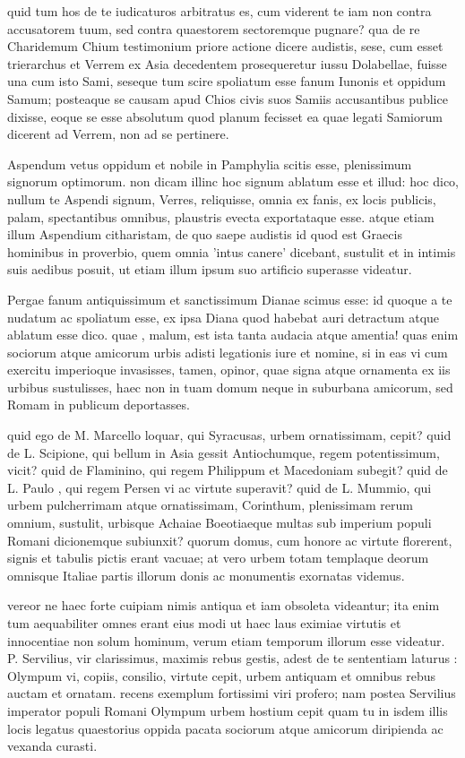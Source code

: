  quid tum hos de te iudicaturos arbitratus es, cum viderent te iam non contra accusatorem tuum, sed contra quaestorem sectoremque pugnare? qua de re Charidemum Chium testimonium priore actione dicere audistis, sese, cum esset trierarchus et Verrem ex Asia decedentem prosequeretur iussu Dolabellae, fuisse una cum isto Sami, seseque tum scire spoliatum esse fanum Iunonis et oppidum Samum; posteaque se causam apud Chios civis suos Samiis accusantibus publice dixisse, eoque se esse absolutum quod planum fecisset ea quae legati Samiorum dicerent ad Verrem, non ad se pertinere.

 Aspendum vetus oppidum et nobile in Pamphylia scitis esse, plenissimum signorum optimorum. non dicam illinc hoc signum ablatum esse et illud: hoc dico, nullum te Aspendi signum, Verres, reliquisse, omnia ex fanis, ex locis publicis, palam, spectantibus omnibus, plaustris evecta exportataque esse. atque etiam illum Aspendium citharistam, de quo saepe audistis id quod est Graecis hominibus in proverbio, quem omnia 'intus canere' dicebant, sustulit et in intimis suis aedibus posuit, ut etiam illum ipsum suo artificio superasse videatur.

 Pergae fanum antiquissimum et sanctissimum Dianae scimus esse: id quoque a te nudatum ac spoliatum esse, ex ipsa Diana quod habebat auri detractum atque ablatum esse dico. quae , malum, est ista tanta audacia atque amentia! quas enim sociorum atque amicorum urbis adisti legationis iure et nomine, si in eas vi cum exercitu imperioque invasisses, tamen, opinor, quae signa atque ornamenta ex iis urbibus sustulisses, haec non in tuam domum neque in suburbana amicorum, sed Romam in publicum deportasses.

 quid ego de M. Marcello loquar, qui Syracusas, urbem ornatissimam, cepit? quid de L. Scipione, qui bellum in Asia gessit Antiochumque, regem potentissimum, vicit? quid de Flaminino, qui regem Philippum et Macedoniam subegit? quid de L. Paulo , qui regem Persen vi ac virtute superavit? quid de L. Mummio, qui urbem pulcherrimam atque ornatissimam, Corinthum, plenissimam rerum omnium, sustulit, urbisque Achaiae Boeotiaeque multas sub imperium populi Romani dicionemque subiunxit? quorum domus, cum honore ac virtute florerent, signis et tabulis pictis erant vacuae; at vero urbem totam templaque deorum omnisque Italiae partis illorum donis ac monumentis exornatas videmus.

 vereor ne haec forte cuipiam nimis antiqua et iam obsoleta videantur; ita enim tum aequabiliter omnes erant eius modi ut haec laus eximiae virtutis et innocentiae non solum hominum, verum etiam temporum illorum esse videatur. P. Servilius, vir clarissimus, maximis rebus gestis, adest de te sententiam laturus : Olympum vi, copiis, consilio, virtute cepit, urbem antiquam et omnibus rebus auctam et ornatam. recens exemplum fortissimi viri profero; nam postea Servilius imperator populi Romani Olympum urbem hostium cepit quam tu in isdem illis locis legatus quaestorius oppida pacata sociorum atque amicorum diripienda ac vexanda curasti.

